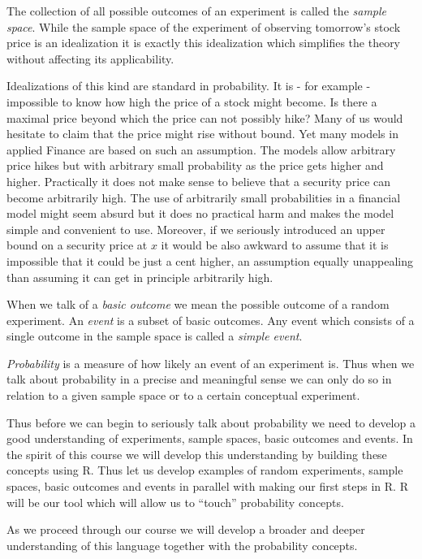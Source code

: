 \documentclass[
]{book}
\begin{document}
The collection of all possible outcomes of an experiment is called the \emph{sample space}.
While the sample space of the experiment of observing tomorrow's stock price
is an idealization it is
exactly this idealization which simplifies the theory without affecting its applicability.

Idealizations of this kind are standard in probability. It
is - for example - impossible to know how high the price of a stock might become. Is there
a maximal price beyond which the price can not possibly hike? Many of us would
hesitate to claim that the price might rise without bound. Yet many models in applied
Finance are based on such an assumption. The models allow arbitrary price hikes but with arbitrary
small probability as the price gets higher and higher. Practically it does not make sense
to believe that a security price can become arbitrarily high. The use of arbitrarily small
probabilities in a financial model might seem absurd but it does no practical harm and makes
the model simple and convenient to use. Moreover, if we seriously introduced an upper bound
on a security price at \(x\) it would be also awkward to assume that it is impossible that it
could be just a cent higher, an assumption equally unappealing than assuming it can get in
principle arbitrarily high.

When we talk of a \emph{basic outcome} we mean the possible outcome of a random experiment.
An \emph{event} is
a subset of basic outcomes. Any event which consists of a single outcome in the sample space
is called a \emph{simple event}.

\emph{Probability} is a measure of how likely an event of an experiment is. Thus when we
talk about probability in a precise and meaningful sense we can only do so in relation to
a given sample space or to a certain conceptual experiment.

Thus before we can begin to seriously
talk about probability we need to develop a good understanding of experiments, sample
spaces, basic outcomes and events. In the spirit of this course we will develop this
understanding by building these concepts using R. Thus let us develop examples
of random experiments, sample spaces, basic outcomes and events in parallel with
making our first steps in R. R will be our tool which will allow us to ``touch''
probability concepts.

As we proceed through our course we will develop a broader and deeper
understanding of this language together with the probability concepts.
\end{document}
